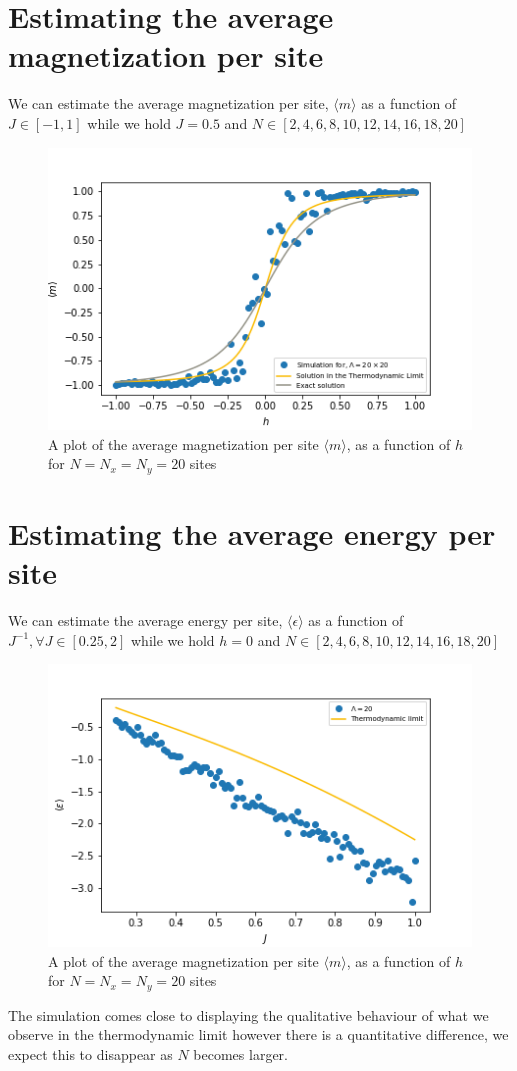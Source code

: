 \documentclass{cernatsnote}
\begin{document}
\section{Estimating the average magnetization per site}
We can estimate the average magnetization per site, $\langle m \rangle$ as a function of $J \in [-1,1]$ while we hold $J = 0.5$ and $N \in [2,4,6,8,10,12,14,16,18,20]$
\begin{figure}[H]
    \centering
    \includegraphics[scale = 0.7]{images/m_v_h_20.png}
    \caption{A plot of the average magnetization per site $\langle m \rangle$, as a function of $h$ for $N = N_{x} = N_{y} = 20$ sites}
    \label{fig:avg_mag}
\end{figure}
\section{Estimating the average energy per site}
We can estimate the average energy per site, $\langle \epsilon \rangle$ as a function of $J^{-1}, \forall J \in [0.25,2]$ while we hold $h = 0$ and $N \in [2,4,6,8,10,12,14,16,18,20]$
\begin{figure}[H]
    \centering
    \includegraphics[scale = 0.5]{images/e_v_j_20.png}
    \caption{A plot of the average magnetization per site $\langle m \rangle$, as a function of $h$ for $N = N_{x} = N_{y} = 20$ sites}
    \label{fig:e_v_j}
\end{figure}
The simulation comes close to displaying the qualitative behaviour of what we observe in the thermodynamic limit however there is a quantitative difference, we expect this to disappear as $N$ becomes larger.
\end{document}
